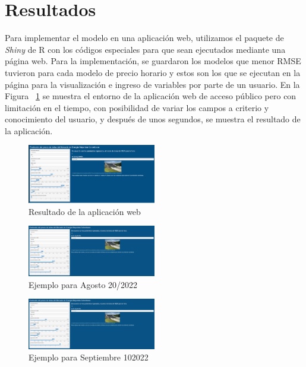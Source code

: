 \documentclass[conference, 10pt]{IEEEtran}
\begin{document}
\section{Resultados}
Para implementar el modelo en una aplicación web, utilizamos el paquete de \textit{Shiny} de R con los códigos especiales para que sean ejecutados mediante una página web. Para la implementación, se guardaron los modelos que menor RMSE tuvieron para cada modelo de precio horario y estos son los que se ejecutan en la página para la visualización e ingreso de variables por parte de un usuario. En la Figura ~\ref{fig_3} se muestra el entorno de la aplicación web de acceso público pero con limitación en el tiempo, con posibilidad de variar los campos a criterio y conocimiento del usuario, y después de unos segundos, se muestra el resultado de la aplicación. 

\begin{figure}[htbp]
\centerline{\includegraphics[width=0.5\textwidth]{../Images/Resultado_Trabajo_final.png}}
\caption{Resultado de la aplicación web}
\label{fig_3}
\end{figure}

\begin{figure}[htbp]
\centerline{\includegraphics[width=0.5\textwidth]{../Images/AppWeb1.png}}
\caption{Ejemplo para Agosto 20/2022}
\label{fig_4}
\end{figure}


\begin{figure}[htbp]
\centerline{\includegraphics[width=0.5\textwidth]{../Images/AppWeb2.png}}
\caption{Ejemplo para Septiembre 10\/2022}
\label{fig_5}
\end{figure}
\end{document}
